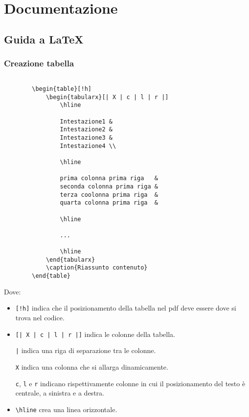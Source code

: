 \documentclass[a4paper, 12pt]{article}
\begin{document}
\tableofcontents

\newpage

\section{Documentazione}

\subsection{Guida a \LaTeX}

\subsubsection{Creazione tabella}
\label{subsub:tab}
\begin{lstlisting}

        \begin{table}[!h]
            \begin{tabularx}[| X | c | l | r |]
                \hline

                Intestazione1 &
                Intestazione2 &
                Intestazione3 &
                Intestazione4 \\

                \hline

                prima colonna prima riga   &
                seconda colonna prima riga &
                terza coolonna prima riga  &
                quarta colonna prima riga  &

                \hline

                ...

                \hline
            \end{tabularx}
            \caption{Riassunto contenuto}
        \end{table}
\end{lstlisting}
Dove:
\begin{itemize}
    \item \lstinline+[!h]+ indica che il posizionamento della tabella nel pdf deve essere dove si trova nel codice.
    
    \item \lstinline+[| X | c | l | r |]+ indica le colonne della tabella.

    \lstinline+|+ indica una riga di separazione tra le colonne.

    \lstinline+X+ indica una colonna che si allarga dinamicamente.

    \lstinline+c+, \lstinline+l+ e \lstinline+r+ indicano rispettivamente colonne in cui il posizionamento del testo è centrale, a sinistra e a destra.

    \item \lstinline+\hline+ crea una linea orizzontale.
\end{itemize}
\end{document}
